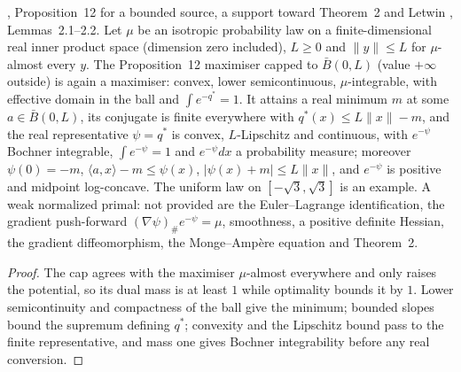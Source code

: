 \begin{lemma}
  \label{lem:cek-bounded-primal}
  \leanok
  \cite{CorderoKlartag2015}, Proposition~12 for a bounded source, a support toward Theorem~2 and Letwin
  \cite{Letwin2026QuadraticKLS}, Lemmas~2.1--2.2.  Let $\mu$ be an isotropic probability law on a finite-dimensional real
  inner product space (dimension zero included), $L\ge0$ and $\|y\|\le L$ for $\mu$-almost every $y$.  The Proposition~12
  maximiser capped to $\bar B(0,L)$ (value $+\infty$ outside) is again a maximiser: convex, lower semicontinuous,
  $\mu$-integrable, with effective domain in the ball and $\int e^{-q^*}=1$.  It attains a real minimum $m$ at some
  $a\in\bar B(0,L)$, its conjugate is finite everywhere with $q^*(x)\le L\|x\|-m$, and the real representative $\psi=q^*$ is
  convex, $L$-Lipschitz and continuous, with $e^{-\psi}$ Bochner integrable, $\int e^{-\psi}=1$ and $e^{-\psi}dx$ a
  probability measure; moreover $\psi(0)=-m$, $\langle a,x\rangle-m\le\psi(x)$, $|\psi(x)+m|\le L\|x\|$, and $e^{-\psi}$ is
  positive and midpoint log-concave.  The uniform law on $[-\sqrt3,\sqrt3]$ is an example.  A weak normalized
  primal: not provided are the Euler--Lagrange identification, the gradient push-forward $(\nabla\psi)_\#e^{-\psi}=\mu$,
  smoothness, a positive definite Hessian, the gradient diffeomorphism, the Monge--Amp\`ere equation and Theorem~2.
\end{lemma}
\begin{proof}
  \leanok
  The cap agrees with the maximiser $\mu$-almost everywhere and only raises the potential, so its dual mass is at least $1$
  while optimality bounds it by $1$.  Lower semicontinuity and compactness of the ball give the minimum; bounded slopes bound
  the supremum defining $q^*$; convexity and the Lipschitz bound pass to the finite representative, and mass one gives
  Bochner integrability before any real conversion.
\end{proof}

